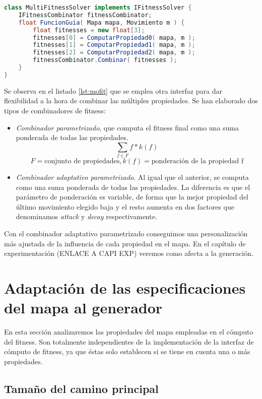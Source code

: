 \begin{lstlisting}[caption={Interfaz de selección de movimiento basada en búsqueda},label={lst:igsf},language=Java,escapechar=|]
class MultiFitnessSolver implements IFitnessSolver {
	IFitnessCombinator fitnessCombinator;
	float FuncionGuia( Mapa mapa, Movimiento m ) {
		float fitnesses = new float[3];
		fitnesses[0] = ComputarPropiedad0( mapa, m );
		fitnesses[1] = ComputarPropiedad1( mapa, m );
		fitnesses[2] = ComputarPropiedad2( mapa, m );
		fitnessCombinator.Combinar( fitnesses );
	}
}
\end{lstlisting}

Se observa en el listado \ref{lst:mofit} que se emplea otra interfaz para dar flexibilidad a la hora de combinar las múltiples propiedades. Se han elaborado dos tipos de combinadores de fitness:

\begin{itemize}
	\item \emph{Combinador parametrizado}, que computa el fitness final como una suma ponderada de todas las propiedades.
		$$ \sum_{f \in F} f * k(f)$$
		$$F = \text{conjunto de propiedades}, k(f) = \text{ponderación de la propiedad f} $$
	\item \emph{Combinador adaptativo parametrizado}. Al igual que el anterior, se computa como una suma ponderada de todas las propiedades. La diferencia es que el parámetro de ponderación es variable, de forma que la mejor propiedad del último movimiento elegido baja y el resto aumenta en dos factores que denominamos \emph{attack} y \emph{decay} respectivamente.
\end{itemize}

Con el combinador adaptativo parametrizado conseguimos una personalización más ajustada de la influencia de cada propiedad en el mapa. En el capítulo de experimentación (ENLACE A CAPI EXP) veremos como afecta a la generación.

\section{Adaptación de las especificaciones del mapa al generador}

En esta sección analizaremos las propiedades del mapa empleadas en el cómputo del fitness. Son totalmente independientes de la implementación de la interfaz de cómputo de fitness, ya que éstas solo establecen si se tiene en cuenta una o más propiedades.

\subsection{Tamaño del camino principal}


